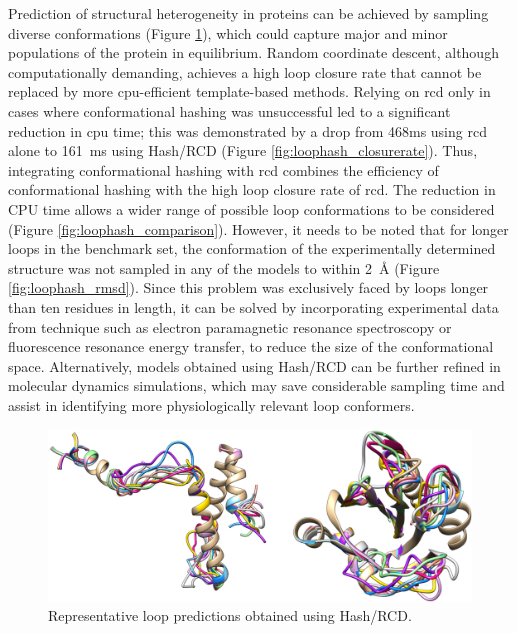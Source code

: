 Prediction of structural heterogeneity in proteins can be achieved by sampling diverse conformations (Figure \ref{fig:loophash_gallery}), which could capture major and minor populations of the protein in equilibrium. Random coordinate descent, although computationally demanding, achieves a high loop closure rate that cannot be replaced by more \gls{cpu}-efficient template-based methods. Relying on \gls{rcd} only in cases where conformational hashing was unsuccessful led to a significant reduction in \gls{cpu} time; this was demonstrated by a drop from 468ms using \gls{rcd} alone to \SI{161}{ms} using Hash/RCD (Figure \ref{fig:loophash_closurerate}). Thus, integrating conformational hashing with \gls{rcd} combines the efficiency of conformational hashing with the high loop closure rate of \gls{rcd}. The reduction in CPU time allows a wider range of possible loop conformations to be considered (Figure \ref{fig:loophash_comparison}). However, it needs to be noted that for longer loops in the benchmark set, the conformation of the experimentally determined structure was not sampled in any of the models to within \SI{2}{\angstrom} (Figure \ref{fig:loophash_rmsd}). Since this problem was exclusively faced by loops longer than ten residues in length, it can be solved by incorporating experimental data from technique such as electron paramagnetic resonance spectroscopy or fluorescence resonance energy transfer, to reduce the size of the conformational space. Alternatively, models obtained using Hash/RCD can be further refined in molecular dynamics simulations, which may save considerable sampling time and assist in identifying more physiologically relevant loop conformers.

\begin{figure}[h!]
\centering
\includegraphics[width=5.5in]{Figures/loophash_gallery.pdf}
 \caption[Representative loop predictions obtained using Hash/RCD.]{Representative loop predictions obtained using Hash/RCD.}
\label{fig:loophash_gallery}
\end{figure}

